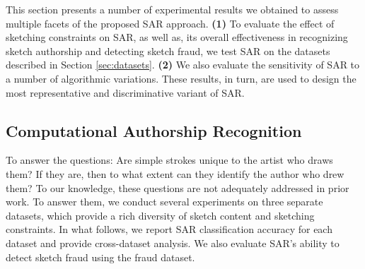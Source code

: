 This section presents a number of experimental results we obtained to assess multiple facets of the proposed SAR approach. \textbf{(1)} To evaluate the effect of sketching constraints on SAR, as well as, its overall effectiveness in recognizing sketch authorship and detecting sketch fraud, we test SAR on the datasets described in Section \ref{sec:datasets}. \textbf{(2)} We also evaluate the sensitivity of SAR to a number of algorithmic variations. These results, in turn, are used to design the most representative and discriminative variant of SAR. %

\vspace{-2mm}
\subsection{Computational Authorship Recognition}\label{subsec:recognition}
\vspace{-2mm}
To answer the questions: Are simple strokes unique to the artist who draws them?  If they are, then to what extent can they identify the author who drew them? To our knowledge, these questions are not adequately addressed in prior work. To answer them, we conduct several experiments on three separate datasets, which provide a rich diversity of sketch content and sketching constraints. In what follows, we report SAR classification accuracy for each dataset and provide cross-dataset analysis. We also evaluate SAR's ability to detect sketch fraud using the fraud dataset.


